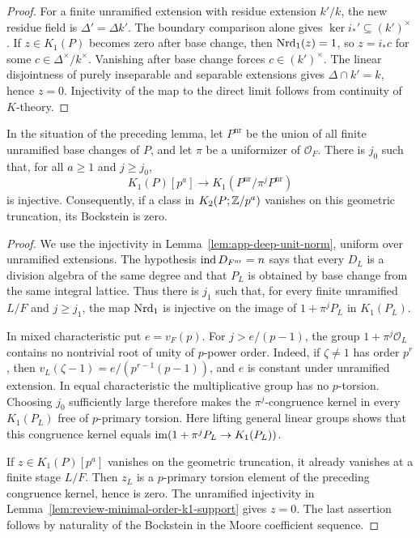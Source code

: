 \begin{proof}
For a finite unramified extension with residue extension $k'/k$, the new residue field is $\Delta'=\Delta k'$.
The boundary comparison alone gives $\ker i_*'\subseteq(k')^\times$.
If $z\in K_1(P)$ becomes zero after base change, then $\operatorname{Nrd}_1(z)=1$, so $z=i_*c$ for some $c\in\Delta^\times/k^\times$.
Vanishing after base change forces $c\in(k')^\times$.
The linear disjointness of purely inseparable and separable extensions gives $\Delta\cap k'=k$, hence $z=0$.
Injectivity of the map to the direct limit follows from continuity of $K$-theory.
\end{proof}

\begin{lemma}
\label{lem:review-geometric-bockstein-detection}
In the situation of the preceding lemma, let $P^{\mathrm{nr}}$ be the union of all finite unramified base changes of $P$, and let $\pi$ be a uniformizer of $\mathcal O_F$.
There is $j_0$ such that, for all $a\ge1$ and $j\ge j_0$,
\[
 K_1(P)[p^a]\longrightarrow K_1(P^{\mathrm{nr}}/\pi^jP^{\mathrm{nr}})
\]
is injective.
Consequently, if a class in $K_2(P;\mathbb Z/p^a)$ vanishes on this geometric truncation, its Bockstein is zero.
\end{lemma}
\begin{proof}
We use the injectivity in Lemma~\ref{lem:app-deep-unit-norm}, uniform over unramified extensions.
The hypothesis $\operatorname{ind} D_{F^{\mathrm{nr}}}=n$ says that every $D_L$ is a division algebra of the same degree and that $P_L$ is obtained by base change from the same integral lattice.
Thus there is $j_1$ such that, for every finite unramified $L/F$ and $j\ge j_1$, the map $\operatorname{Nrd}_1$ is injective on the image of $1+\pi^jP_L$ in $K_1(P_L)$.

In mixed characteristic put $e=v_F(p)$.
For $j>e/(p-1)$, the group $1+\pi^j\mathcal O_L$ contains no nontrivial root of unity of $p$-power order.
Indeed, if $\zeta\ne1$ has order $p^r$, then $v_L(\zeta-1)=e/(p^{r-1}(p-1))$, and $e$ is constant under unramified extension.
In equal characteristic the multiplicative group has no $p$-torsion.
Choosing $j_0$ sufficiently large therefore makes the $\pi^j$-congruence kernel in every $K_1(P_L)$ free of $p$-primary torsion.
Here lifting general linear groups shows that this congruence kernel equals $\operatorname{im}(1+\pi^jP_L\to K_1(P_L))$.

If $z\in K_1(P)[p^a]$ vanishes on the geometric truncation, it already vanishes at a finite stage $L/F$.
Then $z_L$ is a $p$-primary torsion element of the preceding congruence kernel, hence is zero.
The unramified injectivity in Lemma~\ref{lem:review-minimal-order-k1-support} gives $z=0$.
The last assertion follows by naturality of the Bockstein in the Moore coefficient sequence.
\end{proof}


